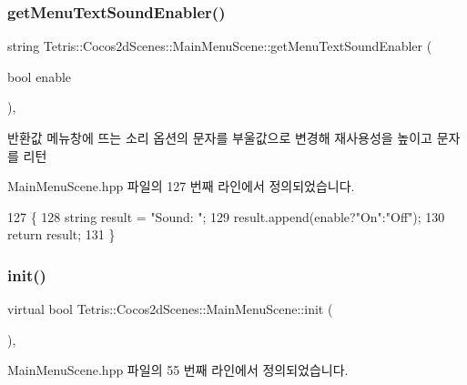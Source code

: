 \subsubsection{\texorpdfstring{get\+Menu\+Text\+Sound\+Enabler()}{getMenuTextSoundEnabler()}}
{\footnotesize\ttfamily string Tetris\+::\+Cocos2d\+Scenes\+::\+Main\+Menu\+Scene\+::get\+Menu\+Text\+Sound\+Enabler (\begin{DoxyParamCaption}\item[{bool}]{enable }\end{DoxyParamCaption})\hspace{0.3cm}{\ttfamily [inline]}, {\ttfamily [protected]}}

\begin{DoxyReturn}{반환값}
메뉴창에 뜨는 소리 옵션의 문자를 부울값으로 변경해 재사용성을 높이고 문자를 리턴 
\end{DoxyReturn}


Main\+Menu\+Scene.\+hpp 파일의 127 번째 라인에서 정의되었습니다.


\begin{DoxyCode}
127                                                \{
128         \textcolor{keywordtype}{string} result = \textcolor{stringliteral}{"Sound: "};
129         result.append(enable?\textcolor{stringliteral}{"On"}:\textcolor{stringliteral}{"Off"});
130         \textcolor{keywordflow}{return} result;
131     \}
\end{DoxyCode}
\mbox{\label{class_tetris_1_1_cocos2d_scenes_1_1_main_menu_scene_ae4d89ddd3650f5f24e86ea631092ecb9}} 
\subsubsection{\texorpdfstring{init()}{init()}}
{\footnotesize\ttfamily virtual bool Tetris\+::\+Cocos2d\+Scenes\+::\+Main\+Menu\+Scene\+::init (\begin{DoxyParamCaption}{ }\end{DoxyParamCaption})\hspace{0.3cm}{\ttfamily [inline]}, {\ttfamily [virtual]}}



Main\+Menu\+Scene.\+hpp 파일의 55 번째 라인에서 정의되었습니다.


